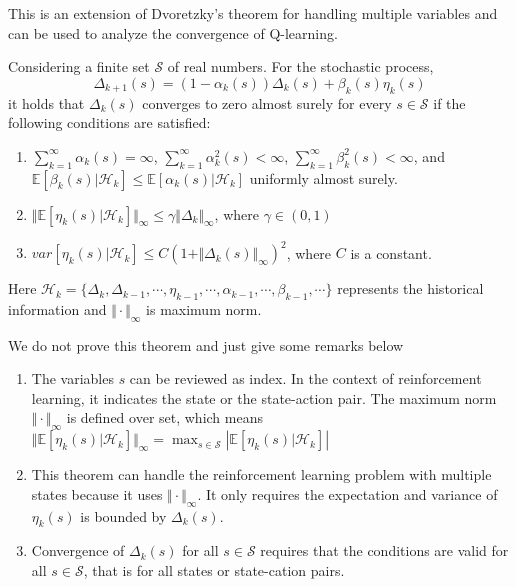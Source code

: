   This is an extension of Dvoretzky's theorem for handling multiple variables and can be used to analyze the convergence
  of Q-learning.
  \begin{theorem}
    Considering a finite set $\mathcal{S}$ of real numbers. For the stochastic process,
    \begin{equation}
      \label{eq:dvo-extension}
      \Delta_{k+1}(s) = (1-\alpha_{k}(s)) \Delta_{k}(s) + \beta_{k}(s)\eta_{k}(s)
    \end{equation}
    it holds that $\Delta_{k}(s)$ converges to zero almost surely for every $s\in \mathcal{S}$ if the following conditions
    are satisfied:
    \begin{enumerate}[label=(\alph*)]
      \item
            $\sum_{k=1}^{\infty} \alpha_{k}(s)=\infty$, $\sum_{k=1}^{\infty} \alpha_{k}^{2}(s)<\infty$, $\sum_{k=1}^{\infty}
              \beta_{k}^{2}(s)<\infty$, and $\mathbb{E}[\beta_{k}(s)|\mathcal{H}_{k}]\le
              \mathbb{E}[\alpha_{k}(s)|\mathcal{H}_{k}]$ uniformly almost surely.
      \item
            $\Vert\mathbb{E}[\eta_{k}(s)|\mathcal{H}_{k}]\Vert_{\infty} \le \gamma\Vert \Delta_{k}\Vert_{\infty}$, where $\gamma
              \in (0,1)$
      \item
            $var[\eta_{k}(s)|\mathcal{H}_{k}] \le C(1+\Vert \Delta_{k}(s)\Vert_{\infty})^{2}$, where $C$ is a constant.
    \end{enumerate}
    Here $\mathcal{H}_{k}=\{\Delta_{k}, \Delta_{k-1},\cdots,\eta_{k-1},\cdots,\alpha_{k-1},\cdots,\beta_{k-1},\cdots\}$
    represents the historical information and $\Vert \cdot \Vert_{\infty}$ is maximum norm.
  \end{theorem}
  We do not prove this theorem and just give some remarks below
  \begin{enumerate}

    \item
          The variables $s$ can be reviewed as index. In the context of reinforcement learning, it indicates the state or the
          state-action pair. The maximum norm $\Vert \cdot \Vert_{\infty}$ is defined over set, which means
          $\Vert\mathbb{E}[\eta_{k}(s)|\mathcal{H}_{k}]\Vert_{\infty}=\max_{s\in
              \mathcal{S}}\left|\mathbb{E}[\eta_{k}(s)|\mathcal{H}_{k}]\right|$
    \item
          This theorem can handle the reinforcement learning problem with multiple states because it uses $\Vert \cdot
            \Vert_{\infty}$. It only requires the expectation and variance of $\eta_{k}(s)$ is bounded by $\Delta_{k}(s)$.
    \item
          Convergence of $\Delta_{k}(s)$ for all $s\in \mathcal{S}$ requires that the conditions are valid for all $s \in
            \mathcal{S}$, that is for all states or state-cation pairs.

  \end{enumerate}

